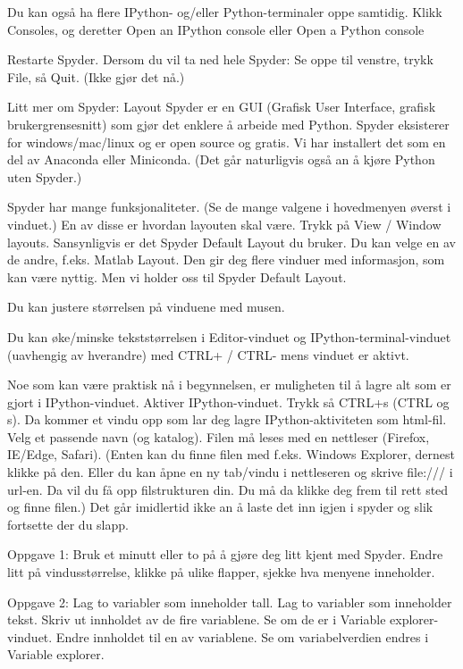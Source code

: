 \documentclass[a4paper,11pt,utf8]{book}
\begin{document}
Du kan også ha flere IPython- og/eller Python-terminaler oppe samtidig.
Klikk Consoles, og deretter 
Open an IPython console
eller 
Open a Python console


Restarte Spyder.
Dersom du vil ta ned hele Spyder: Se oppe til venstre, trykk File, så Quit. 
(Ikke gjør det nå.) 


Litt mer om Spyder: Layout 
Spyder er en GUI (Grafisk User Interface, grafisk brukergrensesnitt)
som gjør det enklere å arbeide med Python.
Spyder eksisterer for windows/mac/linux og er open source og gratis. 
Vi har installert det som en del av Anaconda eller Miniconda. 
(Det går naturligvis også an å kjøre Python uten Spyder.)


Spyder har mange funksjonaliteter.
(Se de mange valgene i hovedmenyen øverst i vinduet.)
En av disse er hvordan layouten skal være. 
Trykk på View / Window layouts.
Sansynligvis er det Spyder Default Layout du bruker.
Du kan velge en av de andre, f.eks. Matlab Layout.
Den gir deg flere vinduer med informasjon, som kan være nyttig.
Men vi holder oss til Spyder Default Layout.

Du kan justere størrelsen på vinduene med musen. 

Du kan øke/minske tekststørrelsen i Editor-vinduet og IPython-terminal-vinduet
(uavhengig av hverandre) med CTRL+ / CTRL- mens vinduet er aktivt. 

Noe som kan være praktisk nå i begynnelsen, er muligheten til å lagre alt
som er gjort i IPython-vinduet. 
Aktiver IPython-vinduet. Trykk så CTRL+s (CTRL og s).
Da kommer et vindu opp som lar deg lagre IPython-aktiviteten som html-fil.
Velg et passende navn (og katalog).
Filen må leses med en nettleser (Firefox, IE/Edge, Safari).
(Enten kan du finne filen med f.eks. Windows Explorer, dernest klikke på den. 
Eller du kan åpne en ny tab/vindu i nettleseren og skrive file:/// i url-en.
Da vil du få opp filstrukturen din. Du må da klikke deg frem til rett sted og finne filen.)
Det går imidlertid ikke an å laste det inn igjen i spyder og slik fortsette der du slapp. 


Oppgave 1:
Bruk et minutt eller to på å gjøre deg litt kjent med Spyder.
Endre litt på vindusstørrelse, klikke på ulike flapper, sjekke hva menyene inneholder. 

Oppgave 2:
Lag to variabler som inneholder tall. Lag to variabler som inneholder tekst.
Skriv ut innholdet av de fire variablene. Se om de er i Variable explorer-vinduet.
Endre innholdet til en av variablene. Se om variabelverdien endres i Variable explorer.
\end{document}
